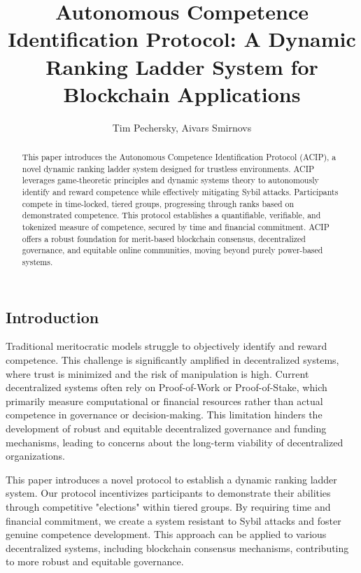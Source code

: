 \documentclass{article}
\title{Autonomous Competence Identification Protocol: A Dynamic Ranking Ladder System for Blockchain Applications}
\author{Tim Pechersky, Aivars Smirnovs}
\begin{document}
\begin{CJK}{UTF8}{gbsn}

    \maketitle

    \begin{abstract}
        {{ This paper introduces the Autonomous Competence Identification Protocol (ACIP), a novel dynamic ranking ladder system designed for trustless environments. ACIP leverages game-theoretic principles and dynamic systems theory to autonomously identify and reward competence while effectively mitigating Sybil attacks. Participants compete in time-locked, tiered groups, progressing through ranks based on demonstrated competence. This protocol establishes a quantifiable, verifiable, and tokenized measure of competence, secured by time and financial commitment. ACIP offers a robust foundation for merit-based blockchain consensus, decentralized governance, and equitable online communities, moving beyond purely power-based systems. }}
    \end{abstract}

    \section{Introduction}

    Traditional meritocratic models struggle to objectively identify and reward competence.\cite{Arrow2000} This challenge is significantly amplified in decentralized systems, where trust is minimized and the risk of manipulation is high.  {{ Current decentralized systems often rely on Proof-of-Work or Proof-of-Stake, which primarily measure computational or financial resources rather than actual competence in governance or decision-making. This limitation hinders the development of robust and equitable decentralized governance and funding mechanisms, leading to concerns about the long-term viability of decentralized organizations. }} \cite{Rainer2023}\cite{Robin22}\cite{Xuan2024}

    This paper introduces a novel protocol to establish a dynamic ranking ladder system. Our protocol incentivizes participants to demonstrate their abilities through competitive "elections" within tiered groups. By requiring time and financial commitment, we create a system resistant to Sybil attacks and foster genuine competence development. This approach can be applied to various decentralized systems, including blockchain consensus mechanisms, contributing to more robust and equitable governance.


\end{CJK}
\end{document}
